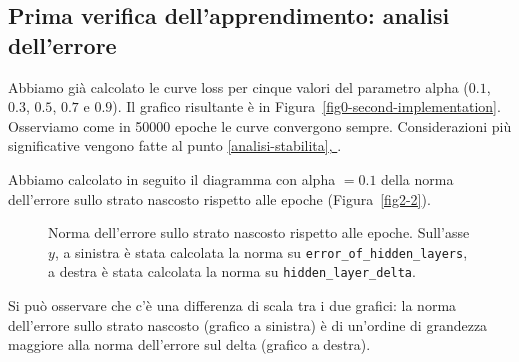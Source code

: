 \documentclass[a4paper,12pt]{article}
\renewcommand*{\fullref}[1]{\hyperref[{#1}]{\vref*{#1}, \emph{\nameref*{#1}}}}
\begin{document}
\newpage
\subsection{Prima verifica dell'apprendimento: analisi dell'errore}\label{prima-verifica}
Abbiamo già calcolato le curve loss per cinque valori del parametro alpha ($0.1$, $0.3$, $0.5$, $0.7$ e $0.9$). Il grafico risultante è in Figura~\vref{fig0-second-implementation}. Osserviamo come in 50000 epoche le curve convergono sempre. Considerazioni più significative vengono fatte al punto \fullref{analisi-stabilita}.\medskip

Abbiamo calcolato in seguito il diagramma con alpha $= 0.1$ della norma dell’errore sullo strato nascosto rispetto alle epoche (Figura~\vref{fig2-2}).  

\begin{figure}[htb]
    \centering
    \caption{Norma dell’errore sullo strato nascosto rispetto alle epoche. Sull'asse $y$, a sinistra è stata calcolata la norma su \texttt{error\_of\_hidden\_layers}, a destra è stata calcolata la norma su \texttt{hidden\_layer\_delta}.}
    \label{fig2-2}
\end{figure}

Si può osservare che c'è una differenza di scala tra i due grafici: la norma dell'errore sullo strato nascosto (grafico a sinistra) è di un'ordine di grandezza maggiore alla norma dell'errore sul delta (grafico a destra).



\newpage
\end{document}
